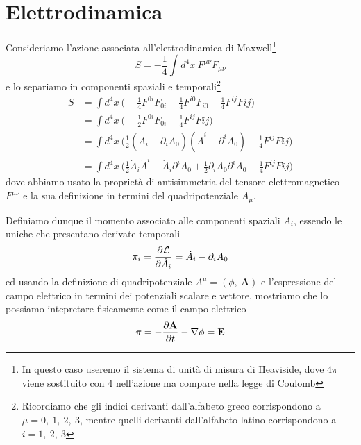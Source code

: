 \section{Elettrodinamica} 

    Consideriamo l'azione associata all'elettrodinamica di Maxwell\footnote{In questo caso useremo il sistema di unità di misura di Heaviside, dove $4\pi$ viene sostituito con $4$ nell'azione ma compare nella legge di Coulomb}
    \begin{equation*}
        S = - \frac{1}{4} \int d^4 x ~ F^{\mu\nu} F_{\mu\nu}
    \end{equation*}
    e lo separiamo in componenti spaziali e temporali\footnote{Ricordiamo che gli indici derivanti dall'alfabeto greco corrispondono a $\mu = 0, ~1, ~2, ~3$, mentre quelli derivanti dall'alfabeto latino corrispondono a $i = 1, ~2, ~3$}
    \begin{equation*}
    \begin{aligned}
        S & = \int d^4 x ~ \Big ( -\frac{1}{4} F^{0i}F_{0i} - \frac{1}{4} F^{i0}F_{i0} - \frac{1}{4} F^{ij} F{ij} \Big) \\ & = \int d^4 x ~ \Big ( -\frac{1}{2} F^{0i}F_{0i} - \frac{1}{4} F^{ij} F{ij} \Big) \\ & = \int d^4 x ~ \Big( \frac{1}{2} (\dot A_i - \partial_i A_0) (\dot A^i - \partial^i A_0) - \frac{1}{4} F^{ij} F{ij} \Big ) \\ & = \int d^4 x ~ \Big (\frac{1}{2} \dot A_i \dot A^i - \dot A_i \partial^i A_0 + \frac{1}{2} \partial_i A_0 \partial^i A_0 - \frac{1}{4} F^{ij} F{ij} \Big )
    \end{aligned}
    \end{equation*}
    dove abbiamo usato la proprietà di antisimmetria del tensore elettromagnetico $F^{\mu\nu}$ e la sua definizione in termini del quadripotenziale $A_\mu$.

    Definiamo dunque il momento associato alle componenti spaziali $A_i$, essendo le uniche che presentano derivate temporali
    \begin{equation} \label{momele}
        \pi_i = \frac{\partial\mathcal L}{\partial\dot A_i} = \dot A_i - \partial_i A_0
    \end{equation}
    ed usando la definizione di quadripotenziale $A^\mu = (\phi, ~ \mathbf A)$ e l'espressione del campo elettrico in termini dei potenziali scalare e vettore, mostriamo che lo possiamo intepretare fisicamente come il campo elettrico
    \begin{equation*}
        \mathbf \pi = - \frac{\partial\mathbf A}{\partial t} - \nabla \phi = \mathbf E
    \end{equation*}
    
